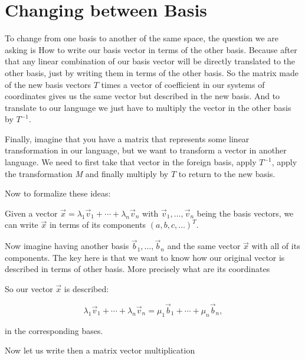 \newpage
\section{Changing between Basis}

To change from one basis to another of the same space, the question we are asking is How to write our basis vector 
in terms of the other basis. Because after that any linear combination of our basis vector will be directly translated 
to the other basis, just by writing them in terms of the other basis. So the matrix made of the new basis vectors 
\(T\) times a vector of coefficient in our systems of coordinates gives us the same vector but described in the new basis.
And to translate to our language we just have to multiply the vector in the other basis by \(T^{-1}\).
\vspace{\baselineskip}

Finally, imagine that you have a matrix that represents some linear transformation in our language, but we want to transform 
a vector in another language. We need to first take that vector in the foreign basis, apply \(T^{-1}\), apply the transformation \emph{M} 
and finally multiply by \(T\) to return to the new basis.
\vspace{\baselineskip}

Now to formalize these ideas:
\vspace{\baselineskip}

Given a vector \(\vec{x} = \lambda_1 \vec{v}_1 + \cdots + \lambda_n \vec{v}_n\) 
with \(\vec{v}_1, \dots, \vec{v}_n\)
being the basis vectors, we can write \(\vec{x}\) in terms of its components \({(a, b, c, \dots)}^T\).
\vspace{\baselineskip}

Now imagine having another basis \(\vec{b}_1, \dots, \vec{b}_n\) and the same vector \(\vec{x}\)
with all of its components. The key here is that we want to know how our original
vector is described in terms of other basis. More precisely what are its coordinates
\vspace{\baselineskip}

So our vector \(\vec{x}\) is described:

\[
    \lambda_1 \vec{v}_1 + \cdots + \lambda_n \vec{v}_n = \mu_1 \vec{b}_1 + \cdots + \mu_n \vec{b}_n,
\]

in the corresponding bases.
\vspace{\baselineskip}

Now let us write then a matrix vector multiplication

